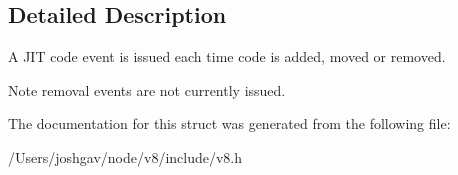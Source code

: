 \subsection{Detailed Description}
A J\+IT code event is issued each time code is added, moved or removed.

\begin{DoxyNote}{Note}
removal events are not currently issued. 
\end{DoxyNote}


The documentation for this struct was generated from the following file\+:\begin{DoxyCompactItemize}
\item 
/\+Users/joshgav/node/v8/include/v8.\+h\end{DoxyCompactItemize}
